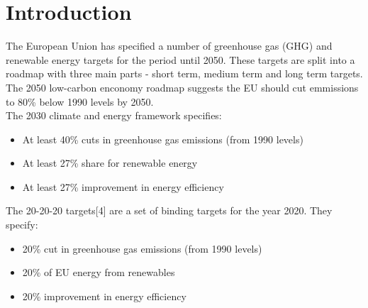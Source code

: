 \documentclass[12pt]{article} %
\newlength{\wideitemsep}
\let\olditem\item
\renewcommand{\item}{\setlength{\itemsep}{\wideitemsep}\olditem}
\begin{document}






\section{Introduction} %
The European Union has specified a number of greenhouse gas (GHG) and renewable energy targets for the period until 2050.
These targets are split into a roadmap with three main parts - short term, medium term and long term targets.
\\
The 2050 low-carbon enconomy roadmap \cite{2050roadmap} suggests the EU should cut emmissions to 80\% below 1990 levels by 2050.
\\
The 2030 climate and energy framework \cite{2030framework} specifies:
  \begin{itemize}
  \item At least 40\% cuts in greenhouse gas emissions (from 1990 levels)
  \item At least 27\% share for renewable energy
  \item At least 27\% improvement in energy efficiency
  \end{itemize}
The 20-20-20 targets[4] are a set of binding targets for the year 2020. They specify:
  \begin{itemize}
  \item 20\% cut in greenhouse gas emissions (from 1990 levels)
  \item 20\% of EU energy from renewables
  \item 20\% improvement in energy efficiency
  \end{itemize}
\end{document}
